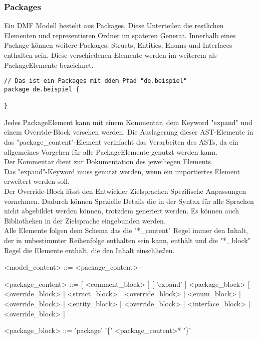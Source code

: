 \documentclass[./einleitung.tex]{subfiles}
\begin{document}
\subsubsection{Packages}
Ein DMF Modell besteht aus Packages. Diese Unterteilen die restlichen Elementen und representieren Ordner im späteren Generat.
Innerhalb eines Package können weitere Packages, Structs, Entities, Enums und Interfaces enthalten sein. Diese verschiedenen Elemente werden im weiterem als PackageElemente bezeichnet.\\
\begin{lstlisting}
// Das ist ein Packages mit ddem Pfad "de.beispiel"
package de.beispiel {

}
\end{lstlisting}
Jedes PackageElement kann mit einem Kommentar, dem Keyword "expand" und einem Override-Block versehen werden.
Die Auslagerung dieser AST-Elemente in das "package_content"-Element verinfacht das Verarbeiten des ASTs, da ein allgemeines Vorgehen für alle PackageElemente genutzt werden kann.\\
Der Kommentar dient zur Dokumentation des jeweiliegen Elements. \\
Das "expand"-Keyword muss genutzt werden, wenn ein importiertes Element erweitert werden soll. \\
Der Override-Block lässt den Entwickler Zielsprachen Spezifische Anpassungen vornehmen. Dadurch können Spezielle Details die in der Syntax für alle Sprachen nicht abgebildet werden können, trotzdem generiert werden. Es können auch Bibliotheken in der Zielsprache eingebunden werden. \\
Alle Elemente folgen dem Schema das die "*_content" Regel immer den Inhalt, der in unbestimmter Reihenfolge enthalten sein kann, enthält und die "*_block" Regel die Elemente enthält, die den Inhalt einschließen.
\begin{grammar}
<model_content> ::= <package_content>+

<package_content> ::= [ <comment_block> ] [ 'expand' ] <package_block> [ <override_block> ]
 <struct_block> [ <override_block> ]
 <enum_block> [ <override_block> ]
 <entity_block> [ <override_block> ]
 <interface_block> [ <override_block> ]

<package_block> ::= 'package' '\{' <package_content>* '\}'
\end{grammar}
\end{document}
